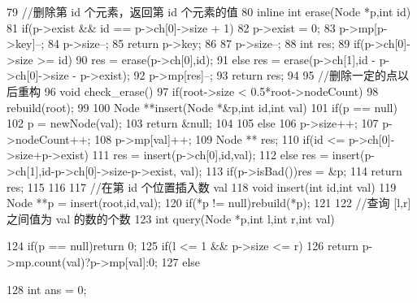 \documentclass[11pt]{article}
\begin{document}
\begin{Code}
{ 79       //删除第 id 个元素，返回第 id 个元素的值
 80       inline int erase(Node *p,int id){
 81           if(p->exist && id == p->ch[0]->size + 1){
 82               p->exist = 0;
 83               p->mp[p->key]--;
 84               p->size--;
 85               return p->key;
 86           }
 87           p->size--;
 88           int res;
 89           if(p->ch[0]->size >= id)
 90               res = erase(p->ch[0],id);
 91           else res = erase(p->ch[1],id - p->ch[0]->size - p->exist);
 92           p->mp[res]--;
 93           return res;
 94       }
 95       //删除一定的点以后重构
 96       void check_erase(){
 97           if(root->size < 0.5*root->nodeCount)
 98               rebuild(root);
 99       }
100       Node **insert(Node *&p,int id,int val){
101           if(p == null){
102               p = newNode(val);
103               return &null;
104           }
105           else {
106               p->size++;
107               p->nodeCount++;
108               p->mp[val]++;
109               Node ** res;
110               if(id <= p->ch[0]->size+p->exist)
111                   res = insert(p->ch[0],id,val);
112               else res = insert(p->ch[1],id-p->ch[0]->size-p->exist,
                     val);
113               if(p->isBad())res = &p;
114               return res;
115           }
116       }
117       //在第 id 个位置插入数 val
118       void insert(int id,int val){
119           Node **p = insert(root,id,val);
120           if(*p != null)rebuild(*p);
121       }
122       //查询 [l,r] 之间值为 val 的数的个数
123       int query(Node *p,int l,int r,int val){
124           if(p == null)return 0;
125           if(l <= 1 && p->size <= r)
126               return p->mp.count(val)?p->mp[val]:0;
127           else {
128               int ans = 0;


}}}
\end{Code}
\end{document}
